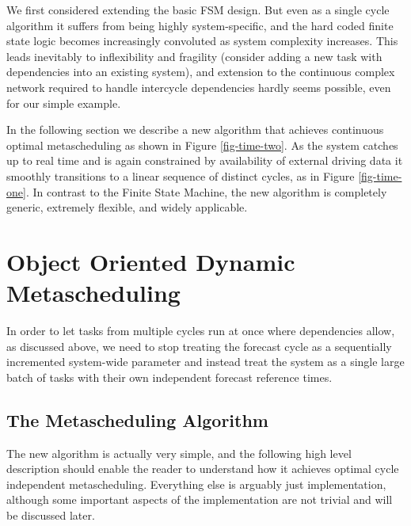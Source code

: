 \documentclass[11pt,a4paper]{article}
\begin{document}
We first considered extending the basic FSM design.  But even as a
single cycle algorithm it suffers from being highly system-specific, and
the hard coded finite state logic becomes increasingly convoluted as
system complexity increases. This leads inevitably to inflexibility and
fragility (consider adding a new task with dependencies into an existing
system), and extension to the continuous complex network required to
handle intercycle dependencies hardly seems possible, even for our
simple example.


In the following section we describe a new algorithm that achieves
continuous optimal metascheduling as shown in Figure \ref{fig-time-two}.
As the system catches up to real time and is again constrained by
availability of external driving data it smoothly transitions to a
linear sequence of distinct cycles, as in Figure \ref{fig-time-one}. In
contrast to the Finite State Machine, the new algorithm is completely
generic, extremely flexible, and widely applicable.  


\section{Object Oriented Dynamic Metascheduling}

In order to let tasks from multiple cycles run at once where
dependencies allow, as discussed above, we need to stop treating the
forecast cycle as a sequentially incremented system-wide
parameter and instead treat the system as a single large batch of tasks
with their own independent forecast reference times. 


\subsection{The Metascheduling Algorithm}

The new algorithm is actually very simple, and the following high level
description should enable the reader to understand how it achieves
optimal cycle independent metascheduling. Everything else is arguably
just implementation, although some important aspects of the
implementation are not trivial and will be discussed later.
\end{document}
